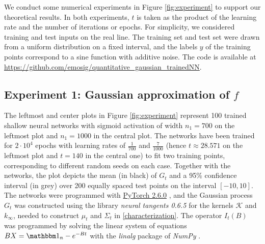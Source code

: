 \documentclass{article}
\theoremstyle{definition}
\theoremstyle{remark}
\numberwithin{equation}{section}
\begin{document}
We conduct some numerical experiments in Figure \ref{fig:experiment} to support our theoretical results.
In both experiments, $t$ is taken as the product of the learning rate and the number of iterations or epochs.
For simplicity, we considered training and test inputs on the real line.
The training set and test set were drawn from a uniform distribution on a fixed interval, 
and the labels $y$ of the training points correspond to a sine function with additive noise.
The code is available at \url{https://github.com/emosig/quantitative_gaussian_trainedNN}.

\subsection{Experiment 1: Gaussian approximation of $f$}

The leftmost and center plots in 
Figure \ref{fig:experiment} represent 100 trained shallow neural networks with sigmoid activation of width $n_1=700$ on the leftmost plot and $n_1=1000$ in the central plot.
The networks have been trained  for $2\cdot10^4$ epochs with learning rates of $\frac{1}{700}$ and $\frac{7}{1000}$ (hence $t \approx 28.571$ on the leftmost plot and $t=140$ in the central one) to fit two training points, corresponding to different random seeds on each case.
Together with the networks, the plot depicts the mean (in black) of $G_t$ and a 95\% confidence interval (in grey) over 200 equally spaced test points on the interval $[-10,10]$.
The networks were programmed with \href{https://download.pytorch.org/whl/cu124/torch-2.6.0%2Bcu124-cp311-cp311-linux_x86_64.whl}{PyTorch 2.6.0} \cite{pytorch}, 
 and the Gaussian process $G_t$ was constructed using the library \emph{neural tangents 0.6.5} \cite{neuraltangents2020} for the kernels $\mathcal K$ and $k_\infty$, 
needed to construct $\mu_t$ and $\Sigma_t$ in \eqref{characterization}.
The operator $I_t(B)$ was programmed by solving the linear system of equations $BX = \mathbbm 1_n - e^{-B t}$ with the \emph{linalg} package of \emph{NumPy} \cite{numpy}.
\end{document}
